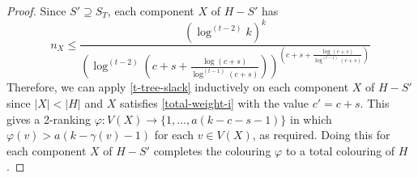 \documentclass[kpfonts]{patmorin}
\theoremstyle{named}
\begin{document}
\begin{proof}
    Since $S'\supseteq S_T$, each component $X$ of $H-S'$ has
   \[
       n_{X} \le \frac{(\log^{(t-2)} k)^k}{
        \left(
            \log^{(t-2)}
                \left(
                   c+s+\tfrac{\log(c+s)}{\log^{(t-1)}(c+s)}
               \right)
        \right)^{\left(
           c+s+\tfrac{\log(c+s)}{\log^{(t-1)}(c+s)}
       \right)}
       }
   \]
   Therefore, we can apply \cref{t-tree-slack} inductively on each component $X$ of $H-S'$ since $|X|<|H|$ and $X$ satisfies \cref{total-weight-i} with the value $c'=c+s$.  This gives a 2-ranking $\varphi:V(X)\to\{1,\ldots,a(k-c-s-1)\}$ in which $\varphi(v)> a(k-\gamma(v)-1)$ for each $v\in V(X)$, as required.
   Doing this for each component $X$ of $H-S'$ completes the colouring $\varphi$ to a total colouring of $H$.


\end{proof}
\end{document}

